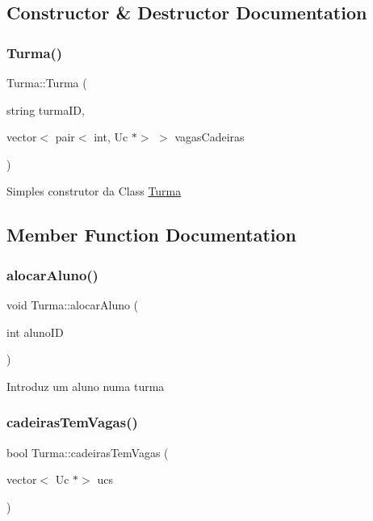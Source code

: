 \subsection{Constructor \& Destructor Documentation}
\hypertarget{class_turma_a5ec97571b81ca3fb4664105c277792b3}{}\label{class_turma_a5ec97571b81ca3fb4664105c277792b3} 
\subsubsection{\texorpdfstring{Turma()}{Turma()}}
{\footnotesize\ttfamily Turma\+::\+Turma (\begin{DoxyParamCaption}\item[{string}]{turma\+ID,  }\item[{vector$<$ pair$<$ int, Uc $\ast$$>$ $>$}]{vagas\+Cadeiras }\end{DoxyParamCaption})}

Simples construtor da Class \hyperlink{class_turma}{Turma} 

\subsection{Member Function Documentation}
\hypertarget{class_turma_a798f323ec0cdc01337dbdc0499a129cc}{}\label{class_turma_a798f323ec0cdc01337dbdc0499a129cc} 
\subsubsection{\texorpdfstring{alocar\+Aluno()}{alocarAluno()}}
{\footnotesize\ttfamily void Turma\+::alocar\+Aluno (\begin{DoxyParamCaption}\item[{int}]{aluno\+ID }\end{DoxyParamCaption})}

Introduz um aluno numa turma \hypertarget{class_turma_a08da4cef2b3125047044ea6ce7f65e1f}{}\label{class_turma_a08da4cef2b3125047044ea6ce7f65e1f} 
\subsubsection{\texorpdfstring{cadeiras\+Tem\+Vagas()}{cadeirasTemVagas()}}
{\footnotesize\ttfamily bool Turma\+::cadeiras\+Tem\+Vagas (\begin{DoxyParamCaption}\item[{vector$<$ Uc $\ast$$>$}]{ucs }\end{DoxyParamCaption})}

